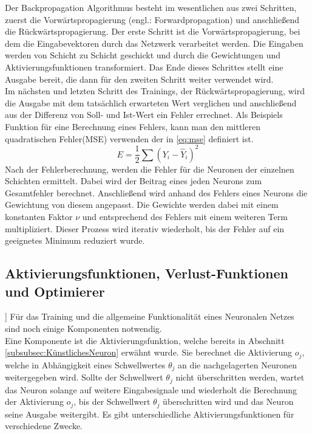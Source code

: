 Der Backpropagation Algorithmus besteht im wesentlichen aus zwei Schritten, zuerst die Vorwärtspropagierung (engl.: Forwardpropagation) und anschließend die Rückwärtspropagierung.
Der erste Schritt ist die Vorwärtspropagierung, bei dem die Eingabevektoren durch das Netzwerk verarbeitet werden. Die Eingaben werden von Schicht zu Schicht geschickt und durch die Gewichtungen und Aktivierungsfunktionen transformiert. Das Ende dieses Schrittes stellt eine Ausgabe bereit, die dann für den zweiten Schritt weiter verwendet wird. \\
Im nächsten und letzten Schritt des Trainings, der Rückwärtspropagierung, wird die Ausgabe mit dem tatsächlich erwarteten Wert verglichen und anschließend aus der Differenz von Soll- und Ist-Wert ein Fehler errechnet. Als Beispiels Funktion für eine Berechnung eines Fehlers, kann man den mittleren quadratischen Fehler(MSE) verwenden der in \ref{eq:mse} definiert ist.
\begin{equation}
	\label{eq:mse}
	E = \dfrac{1}{2} \sum (Y_i - \hat{Y}_{i})^2
\end{equation}
Nach der Fehlerberechnung, werden die Fehler für die Neuronen der einzelnen Schichten ermittelt. Dabei wird der Beitrag eines jeden Neurons zum Gesamtfehler berechnet. Anschließend wird anhand des Fehlers eines Neurons die Gewichtung von diesem angepasst. Die Gewichte werden dabei mit einem konstanten Faktor $\nu$ und entsprechend des Fehlers mit einem weiteren Term multipliziert. Dieser Prozess wird iterativ wiederholt, bis der Fehler auf ein geeignetes Minimum reduziert wurde. \cite[vgl.][]{Scherer1997}



\subsection{Aktivierungsfunktionen, Verlust-Funktionen und Optimierer}
\label{subsec:AktivierungsfunktionenVerlust-FunktionenOptimierer}]
Für das Training und die allgemeine Funktionalität eines Neuronalen Netzes sind noch einige Komponenten notwendig.\\
Eine Komponente ist die Aktivierungsfunktion, welche bereits in Abschnitt \ref{subsubsec:KünstlichesNeuron} erwähnt wurde. Sie berechnet die Aktivierung $o_j$, welche in Abhängigkeit eines Schwellwertes $\theta_j$ an die nachgelagerten Neuronen weitergegeben wird. Sollte der Schwellwert $\theta_j$ nicht überschritten werden, wartet das Neuron solange auf weitere Eingabesignale und wiederholt die Berechnung der Aktivierung $o_j$, bis der Schwellwert $\theta_j$ überschritten wird und das Neuron seine Ausgabe weitergibt. Es gibt unterschiedliche Aktivierungsfunktionen für verschiedene Zwecke.

